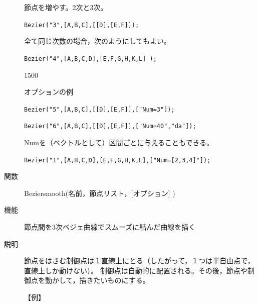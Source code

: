 \documentclass[papersize,a4paper,12pt,uplatex]{jsarticle}
\begin{document}
\begin{description}
節点を増やす。2次と3次。

\verb|Bezier("3",[A,B,C],[[D],[E,F]]);|

\vspace{12mm}

全て同じ次数の場合，次のようにしてもよい。

\verb|Bezier("4",[A,B,C,D],[E,F,G,H,K,L] ); |

\begin{layer}{150}{0}
\end{layer}

\vspace{30mm}

オプションの例

\verb|Bezier("5",[A,B,C],[[D],[E,F]],["Num=3"]);|

\hspace{20mm}

\vspace{-5mm}


\verb|Bezier("6",[A,B,C],[[D],[E,F]],["Num=40","da"]);|

\vspace{-2mm}

\hspace{20mm}

Numを（ベクトルとして）区間ごとに与えることもできる。

\verb|Bezier("1",[A,B,C,D],[E,F,G,H,K,L],["Num=[2,3,4]"]);|

\hspace{10mm} 


\vspace{\baselineskip}
\hypertarget{beziersmooth}{}
\item[関数]Beziersmooth(名前，節点リスト，[オプション] )
\item[機能]節点間を3次ベジェ曲線でスムーズに結んだ曲線を描く
\item[説明]節点をはさむ制御点は１直線上にとる（したがって，１つは半自由点で，直線上しか動けない）。
制御点は自動的に配置される。その後，節点や制御点を動かして，描きたいものにする。

\vspace{\baselineskip}
【例】


\end{description}
\end{document}
